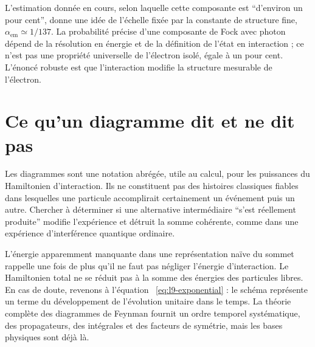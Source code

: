 L’estimation donnée en cours, selon laquelle cette composante est ``d’environ un pour cent'', donne une idée de l’échelle fixée par la constante de structure fine, \(\alpha_{\mathrm{em}}\simeq 1/137\). La probabilité précise d’une composante de Fock avec photon dépend de la résolution en énergie et de la définition de l’état en interaction ; ce n’est pas une propriété universelle de l’électron isolé, égale à un pour cent. L’énoncé robuste est que l’interaction modifie la structure mesurable de l’électron.

\section{Ce qu’un diagramme dit et ne dit pas}

Les diagrammes sont une notation abrégée, utile au calcul, pour les puissances du Hamiltonien d’interaction. Ils ne constituent pas des histoires classiques fiables dans lesquelles une particule accomplirait certainement un événement puis un autre. Chercher à déterminer si une alternative intermédiaire ``s’est réellement produite'' modifie l’expérience et détruit la somme cohérente, comme dans une expérience d’interférence quantique ordinaire.

\begin{classroomqa}
\end{classroomqa}

L’énergie apparemment manquante dans une représentation naïve du sommet rappelle une fois de plus qu’il ne faut pas négliger l’énergie d’interaction. Le Hamiltonien total ne se réduit pas à la somme des énergies des particules libres. En cas de doute, revenons à l’équation ~\eqref{eq:l9-exponential} : le schéma représente un terme du développement de l’évolution unitaire dans le temps. La théorie complète des diagrammes de Feynman fournit un ordre temporel systématique, des propagateurs, des intégrales et des facteurs de symétrie, mais les bases physiques sont déjà là.

